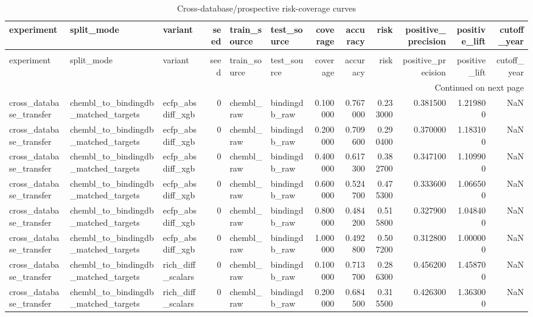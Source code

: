 \begin{longtable}{lllrllrrrrrr}
\caption{Cross-database/prospective risk-coverage curves} \label{tab:table_14b_p0_p1_risk_coverage} \\
\toprule
experiment & split\_mode & variant & seed & train\_source & test\_source & coverage & accuracy & risk & positive\_precision & positive\_lift & cutoff\_year \\
\midrule
\endfirsthead
\caption[]{Cross-database/prospective risk-coverage curves} \\
\toprule
experiment & split\_mode & variant & seed & train\_source & test\_source & coverage & accuracy & risk & positive\_precision & positive\_lift & cutoff\_year \\
\midrule
\endhead
\midrule
\multicolumn{12}{r}{Continued on next page} \\
\midrule
\endfoot
\bottomrule
\endlastfoot
cross\_database\_transfer & chembl\_to\_bindingdb\_matched\_targets & ecfp\_absdiff\_xgb & 0 & chembl\_raw & bindingdb\_raw & 0.100000 & 0.767000 & 0.233000 & 0.381500 & 1.219800 & NaN \\
cross\_database\_transfer & chembl\_to\_bindingdb\_matched\_targets & ecfp\_absdiff\_xgb & 0 & chembl\_raw & bindingdb\_raw & 0.200000 & 0.709600 & 0.290400 & 0.370000 & 1.183100 & NaN \\
cross\_database\_transfer & chembl\_to\_bindingdb\_matched\_targets & ecfp\_absdiff\_xgb & 0 & chembl\_raw & bindingdb\_raw & 0.400000 & 0.617300 & 0.382700 & 0.347100 & 1.109900 & NaN \\
cross\_database\_transfer & chembl\_to\_bindingdb\_matched\_targets & ecfp\_absdiff\_xgb & 0 & chembl\_raw & bindingdb\_raw & 0.600000 & 0.524700 & 0.475300 & 0.333600 & 1.066500 & NaN \\
cross\_database\_transfer & chembl\_to\_bindingdb\_matched\_targets & ecfp\_absdiff\_xgb & 0 & chembl\_raw & bindingdb\_raw & 0.800000 & 0.484200 & 0.515800 & 0.327900 & 1.048400 & NaN \\
cross\_database\_transfer & chembl\_to\_bindingdb\_matched\_targets & ecfp\_absdiff\_xgb & 0 & chembl\_raw & bindingdb\_raw & 1.000000 & 0.492800 & 0.507200 & 0.312800 & 1.000000 & NaN \\
cross\_database\_transfer & chembl\_to\_bindingdb\_matched\_targets & rich\_diff\_scalars & 0 & chembl\_raw & bindingdb\_raw & 0.100000 & 0.713700 & 0.286300 & 0.456200 & 1.458700 & NaN \\
cross\_database\_transfer & chembl\_to\_bindingdb\_matched\_targets & rich\_diff\_scalars & 0 & chembl\_raw & bindingdb\_raw & 0.200000 & 0.684500 & 0.315500 & 0.426300 & 1.363000 & NaN \\

\end{longtable}
